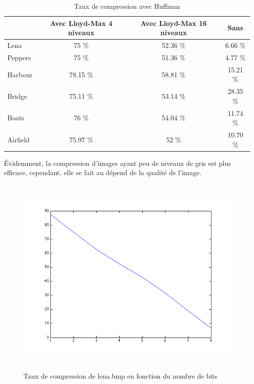 \documentclass[a4paper, 12pt]{article}
\begin{document}
\begin{table}[H]
	\centering
		\begin{tabular}{l|c | c| c|}
			\cline{2-4}
			                               & Avec Lloyd-Max 4 niveaux & Avec Lloyd-Max 16 niveaux & Sans      \\
			\hline
			\multicolumn{1}{|l|}{Lena}     & 75 \%                    & 52.36 \%                  & 6.66 \%   \\
			\hline
			\multicolumn{1}{|l|}{Peppers}  & 75 \%                    & 51.36 \%                  & 4.77 \%   \\
			\hline
			\multicolumn{1}{|l|}{Harbour}  & 78.15 \%                 & 58.81 \%                  & 15.21 \%  \\
			\hline
			\multicolumn{1}{|l|}{Bridge}   & 75.11 \%                 & 53.14 \%                  & 28.35 \%  \\
			\hline
			\multicolumn{1}{|l|}{Boats}    & 76 \%                    & 54.04 \%                  & 11.74 \%  \\
			\hline
			\multicolumn{1}{|l|}{Airfield} & 75.97 \%                 & 52 \%                     & 10.70 \%  \\
			\hline
		\end{tabular}
	\caption{Taux de compression avec Huffman}
	\label{tab:TableComparaisonTauxCompression}
\end{table}

Évidemment, la compression d'images ayant peu de niveaux de gris est plus efficace, cependant, elle se fait au dépend de la qualité de l'image.

\begin{figure}[H]
	\centering
		\includegraphics[width=12cm, height=10cm]{../taux_compression_vs_nb_bits.png}
	\caption{Taux de compression de lena.bmp en fonction du nombre de bits}
	\label{fig:courbe_compression}
\end{figure}
\end{document}
